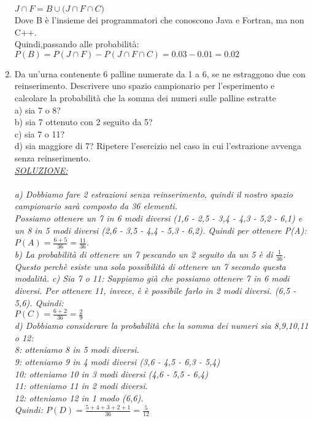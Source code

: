\documentclass{article}
\begin{document}
\begin{enumerate}
{${J}\cap{F} = {B}\cup{({J}\cap{F}\cap{C}})$\\
Dove B è l'insieme dei programmatori che conoscono Java e Fortran, ma non C++.\\
Quindi,passando alle probabilità:\\
$P(B) = P({J}\cap{F})-P({J}\cap{F}\cap{C})=0.03-0.01 = 0.02$\\
}
\item Da un’urna contenente 6 palline numerate da 1 a 6, se ne estraggono due con reinserimento.
Descrivere uno spazio campionario per l’esperimento e calcolare la probabilità
che la somma dei numeri sulle palline estratte\\
a) sia 7 o 8?\\
b) sia 7 ottenuto con 2 seguito da 5?\\
c) sia 7 o 11? \\
d) sia maggiore di 7?
Ripetere l’esercizio nel caso in cui l’estrazione avvenga senza reinserimento.\\
\emph{\underline{SOLUZIONE:}\\ \\
a) Dobbiamo fare 2 estrazioni senza reinserimento, quindi il nostro spazio campionario sarà composto da 36 elementi.\\
Possiamo ottenere un 7 in 6 modi diversi (1,6 - 2,5 - 3,4 - 4,3 - 5,2 - 6,1) e un 8 in 5 modi diversi (2,6 - 3,5 - 4,4 - 5,3 - 6,2). Quindi per ottenere P(A):\\
$P(A) = \frac{6+5}{36} = \frac{11}{36}$.\\
b) La probabilità di ottenere un 7 pescando un 2 seguito da un 5 è di $\frac{1}{36}$. Questo perchè esiste una sola possibilità di ottenere un 7 secondo questa modalità.
c) Sia 7 o 11: Sappiamo già che possiamo ottenere 7 in 6 modi diversi. Per ottenere 11, invece, è è possibile farlo in 2 modi diversi. (6,5 - 5,6). Quindi:\\
$P(C) = \frac{6+2}{36} = \frac{2}{9}$ \\
d) Dobbiamo considerare la probabilità che la somma dei numeri sia 8,9,10,11 o 12:\\
8: otteniamo 8 in 5 modi diversi.\\
9: otteniamo 9 in 4 modi diversi (3,6 - 4,5 - 6,3 - 5,4)\\
10: otteniamo 10 in 3 modi diversi (4,6 - 5,5 - 6,4)\\
11: otteniamo 11 in 2 modi diversi.\\
12: otteniamo 12 in 1 modo (6,6).\\
Quindi: $P(D) = \frac{5+4+3+2+1}{36} = \frac{5}{12}$ \\ \\
}
\end{enumerate}
\end{document}
